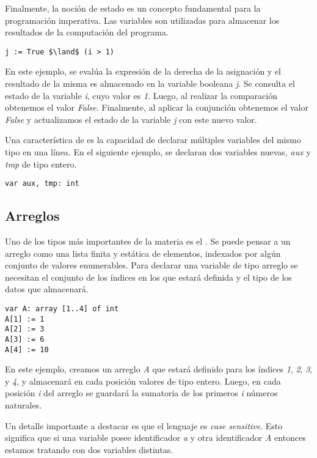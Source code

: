 \documentclass{article}
\begin{document}
Finalmente, la noción de estado es un concepto fundamental para la programación imperativa.
Las variables son utilizadas para almacenar los resultados de la computación del programa.

\begin{lstlisting}
j := True $\land$ (i > 1)
\end{lstlisting}

En este ejemplo, se evalúa la expresión de la derecha de la asignación y el resultado de la misma es almacenado en la variable booleana \textit{j}.
Se consulta el estado de la variable \textit{i}, cuyo valor es \textit{1}.
Luego, al realizar la comparación obtenemos el valor \textit{False}.
Finalmente, al aplicar la conjunción obtenemos el valor \textit{False} y actualizamos el estado de la variable \textit{j} con este nuevo valor.

Una característica de \Lang\space es la capacidad de declarar múltiples variables del mismo tipo en una línea.
En el siguiente ejemplo, se declaran dos variables nuevas, \textit{aux} y \textit{tmp} de tipo entero.

\begin{lstlisting}
var aux, tmp: int
\end{lstlisting}

\subsection{Arreglos}

Uno de los tipos más importantes de la materia es el .
Se puede pensar a un arreglo como una lista finita y estática de elementos, indexados por algún conjunto de valores enumerables.
Para declarar una variable de tipo arreglo se necesitan el conjunto de los índices en los que estará definida y el tipo de los datos que almacenará.

\begin{lstlisting}
var A: array [1..4] of int
A[1] := 1 
A[2] := 3
A[3] := 6
A[4] := 10
\end{lstlisting}

En este ejemplo, creamos un arreglo \textit{A} que estará definido para los índices \textit{1}, \textit{2}, \textit{3}, y \textit{4}, y almacenará en cada posición valores de tipo entero.
Luego, en cada posición \textit{i} del arreglo se guardará la sumatoria de los primeros \textit{i} números naturales.

Un detalle importante a destacar es que el lenguaje \Lang\space es \textit{case sensitive}.
Esto significa que si una variable posee identificador \textit{a} y otra identificador \textit{A} entonces estamos tratando con dos variables distintas.
\end{document}
